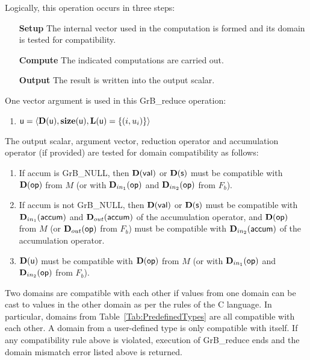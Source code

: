 Logically, this operation occurs in three steps:
\begin{enumerate}[leftmargin=0.85in]
\item[\bf Setup] The internal vector used in the computation is formed 
and its domain is tested for compatibility.
\item[\bf Compute] The indicated computations are carried out.
\item[\bf Output] The result is written into the output scalar.
\end{enumerate}

One vector argument is used in this {\sf GrB\_reduce} operation:
\begin{enumerate}
	\item ${\sf u} = \langle \bold{D}({\sf u}),\bold{size}({\sf u}),
    \bold{L}({\sf u}) = \{(i,u_i) \} \rangle$
\end{enumerate}

The output scalar, argument vector, reduction operator and accumulation 
operator (if provided) are tested for domain compatibility as follows:
\begin{enumerate}

	\item If {\sf accum} is {\sf GrB\_NULL}, then $\bold{D}({\sf val})$ or $\bold{D}({\sf s})$ must be
    compatible with $\bold{D}({\sf op})$ from $M$  (or with $\mbox{$\mathbf{D}_{in_{1}}$}({\sf op})$ and 
    $\mbox{$\mathbf{D}_{in_{2}}$}({\sf op})$ from $F_b$).

	\item If {\sf accum} is not {\sf GrB\_NULL}, then $\bold{D}({\sf val})$ or $\bold{D}({\sf s})$ must be
    compatible with $\mbox{$\mathbf{D}_{in_{1}}$}({\sf accum})$ and $\mbox{$\mathbf{D}_{out}$}({\sf accum})$ of the accumulation operator, and 
    $\bold{D}({\sf op})$ from $M$  (or $\mbox{$\mathbf{D}_{out}$}({\sf op})$ from $F_b$) must be compatible 
    with $\mbox{$\mathbf{D}_{in_{2}}$}({\sf accum})$ of the accumulation operator.

	\item $\bold{D}({\sf u})$ must be compatible with $\bold{D}({\sf op})$ from $M$ 
    (or with $\mbox{$\mathbf{D}_{in_{1}}$}({\sf op})$ and $\mbox{$\mathbf{D}_{in_{2}}$}({\sf op})$ from $F_b$).
\end{enumerate}
Two domains are compatible with each other if values from one domain can be cast 
to values in the other domain as per the rules of the C language.
In particular, domains from Table~\ref{Tab:PredefinedTypes} are all compatible 
with each other. A domain from a user-defined type is only compatible with itself.
If any compatibility rule above is violated, execution of {\sf GrB\_reduce} ends and 
the domain mismatch error listed above is returned.

